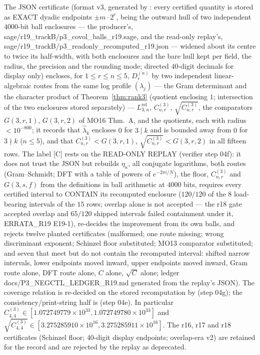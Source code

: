 \begin{lemma}[Certified covolumes and constants at $p=3$ {[C]}]\label{lem:D3cert}
The JSON certificate \artPcert{} (format v3, generated by \artPgen{}: every certified quantity is stored as EXACT dyadic endpoints $\pm m\cdot2^{e}$, being the outward hull of two independent $4000$-bit ball enclosures --- the producer's, sage/r19\_trackB/p3\_covol\_balls\_r19.sage, and the read-only replay's, sage/r19\_trackB/p3\_readonly\_recomputed\_r19.json --- widened about its centre to twice its half-width, with both enclosures and the bare hull kept per field, the radius, the precision and the rounding mode; directed $40$-digit decimals for display only) encloses, for $1\le r\le n\le5$, $D_r^{(n)}$ by two independent linear-algebraic routes from the same log profile $(\lambda_j)$ --- the Gram determinant and the character product of Theorem~\ref{thm:rank3} (quotient enclosing $1$; intersection of the two enclosures stored separately) --- $L^{\mathrm{rel}}_{3,n}$, $C^{(3)}_{n,r}$, $\sqrt{C^{(3)}_{n,r}}$, the comparators $G(3,r,1)$, $G(3,r,2)$ of MO16 Thm.~A, and the quotients, each with radius $<10^{-800}$; it records that $\hat\lambda_k$ encloses $0$ for $3\mid k$ and is bounded away from $0$ for $3\nmid k$ ($n\le5$), and that $C^{(3)}_{n,r}<G(3,r,1)$, $\sqrt{C^{(3)}_{n,r}}<G(3,r,2)$ in all fifteen rows. The label [C] rests on the READ-ONLY REPLAY \artPreplay{} (verifier step 04f): it does not trust the JSON but rebuilds $\eta_n$, all conjugate logarithms, both routes (Gram--Schmidt; DFT with a table of powers of $e^{-2\pi i/N}$), the floor, $C^{(3)}_{n,r}$ and $G(3,s,f)$ from the definitions in ball arithmetic at $4000$ bits, requires every certified interval to CONTAIN its recomputed enclosure ($120/120$ of the $8$ load-bearing intervals of the $15$ rows; overlap alone is not accepted --- the r18 gate accepted overlap and $65/120$ shipped intervals failed containment under it, ERRATA\_R19 E19-1), re-decides the improvement from its own balls, and rejects twelve planted certificates (malformed; one route missing; wrong discriminant exponent; Schinzel floor substituted; MO13 comparator substituted; and seven that meet but do not contain the recomputed interval: shifted narrow intervals, lower endpoints moved inward, upper endpoints moved inward, Gram route alone, DFT route alone, $C$ alone, $\sqrt C$ alone; ledger docs/P3\_NEGCTL\_LEDGER\_R19.md generated from the replay's JSON). The coverage relation is re-decided on the stored recomputation by \artPcover{} (step 04g); the consistency/print-string half is \artPcheck{} (step 04e). In particular $C^{(3)}_{4,4}\in[1.072749779\times10^{33},1.072749780\times10^{33}]$ and $\sqrt{C^{(3)}_{4,4}}\in[3.275285910\times10^{16},3.275285911\times10^{16}]$. The r16, r17 and r18 certificates (Schinzel floor; $40$-digit display endpoints; overlap-era v2) are retained for the record and are rejected by the replay as deprecated.
\end{lemma}
